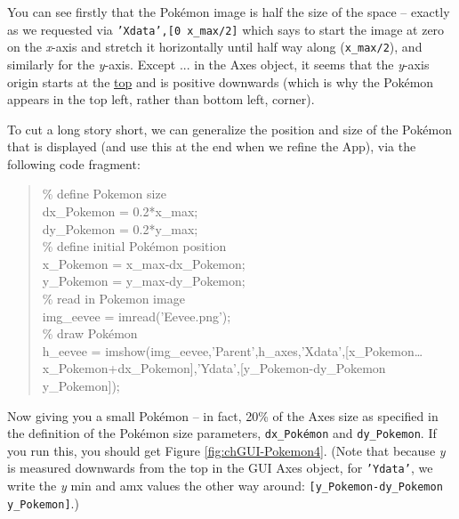 \documentclass{tufte-book} %
\newenvironment{docspec}{\begin{quotation}\ttfamily\parskip0pt\parindent0pt\ignorespaces}{\end{quotation}}
\begin{document}
You can see firstly that the Pok\'emon image is  half the size of the space -- exactly as we requested via \texttt{\textcolor[rgb]{0.501961,0,1}{'Xdata'},[0 x\_max/2]} which says to start the image at zero on the \textit{x}-axis and stretch it horizontally until half way along (\texttt{x\_max/2}), and similarly for the \textit{y}-axis. Except ... in the \textsf{Axes} object, it seems that the \textit{y}-axis origin starts at the \uline{top} and is positive downwards (which is why the Pok\'emon appears in the top left, rather than bottom left, corner).

To cut a long story short, we can generalize the position and size of the Pok\'emon that is displayed (and use this at the end when we refine the App), via the following  code fragment:
\begin{docspec}
\textcolor[rgb]{0,0.501961,0}{\% define Pokemon size}
\\dx\_Pokemon = 0.2*x\_max;
\\dy\_Pokemon = 0.2*y\_max;
\\\textcolor[rgb]{0,0.501961,0}{\% define initial Pok\'emon position}
\\x\_Pokemon = x\_max-dx\_Pokemon;
\\y\_Pokemon = y\_max-dy\_Pokemon;
\\\textcolor[rgb]{0,0.501961,0}{\% read in Pokemon image}
\\img\_eevee = imread(\textcolor[rgb]{0.501961,0,1}{'Eevee.png'});
\\\textcolor[rgb]{0,0.501961,0}{\% draw Pok\'emon}
\\h\_eevee = imshow(img\_eevee,\textcolor[rgb]{0.501961,0,1}{'Parent'},h\_axes,\textcolor[rgb]{0.501961,0,1}{'Xdata'},[x\_Pokemon\ldots
\\ x\_Pokemon+dx\_Pokemon],\textcolor[rgb]{0.501961,0,1}{'Ydata'},[y\_Pokemon-dy\_Pokemon y\_Pokemon]);
\end{docspec}
Now giving you a small Pok\'emon -- in fact, 20\% of the \textsf{Axes} size as specified in the definition of the Pok\'emon size parameters, \texttt{dx\_Pok\'emon} and \texttt{dy\_Pokemon}. If you run this, you should get Figure \ref{fig:chGUI-Pokemon4}. (Note that because \textit{y} is measured downwards from the top in the GUI \textsf{Axes} object, for \textcolor[rgb]{0.501961,0,1}{\texttt{'Ydata'}}, we write  the \textit{y} min and amx values the other way around: \texttt{[y\_Pokemon-dy\_Pokemon y\_Pokemon]}.)
\end{document}

